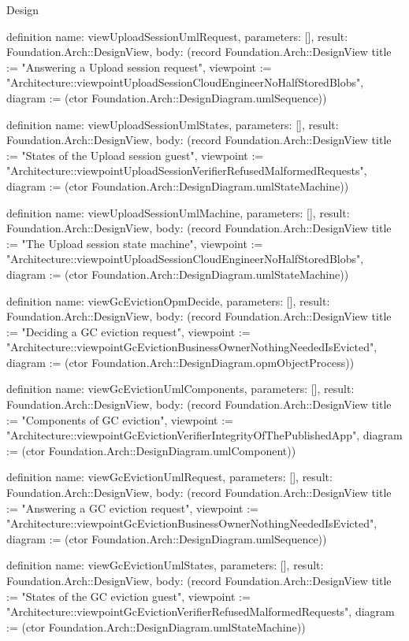 \begin{lexlean}{Design}
\begin{semanticmodule}
definition{
  name: viewUploadSessionUmlRequest,
  parameters: [],
  result: Foundation.Arch::DesignView,
  body: (record Foundation.Arch::DesignView {title := "Answering a Upload session request", viewpoint := "Architecture::viewpointUploadSessionCloudEngineerNoHalfStoredBlobs", diagram := (ctor Foundation.Arch::DesignDiagram.umlSequence)})
}

definition{
  name: viewUploadSessionUmlStates,
  parameters: [],
  result: Foundation.Arch::DesignView,
  body: (record Foundation.Arch::DesignView {title := "States of the Upload session guest", viewpoint := "Architecture::viewpointUploadSessionVerifierRefusedMalformedRequests", diagram := (ctor Foundation.Arch::DesignDiagram.umlStateMachine)})
}

definition{
  name: viewUploadSessionUmlMachine,
  parameters: [],
  result: Foundation.Arch::DesignView,
  body: (record Foundation.Arch::DesignView {title := "The Upload session state machine", viewpoint := "Architecture::viewpointUploadSessionCloudEngineerNoHalfStoredBlobs", diagram := (ctor Foundation.Arch::DesignDiagram.umlStateMachine)})
}

definition{
  name: viewGcEvictionOpmDecide,
  parameters: [],
  result: Foundation.Arch::DesignView,
  body: (record Foundation.Arch::DesignView {title := "Deciding a GC eviction request", viewpoint := "Architecture::viewpointGcEvictionBusinessOwnerNothingNeededIsEvicted", diagram := (ctor Foundation.Arch::DesignDiagram.opmObjectProcess)})
}

definition{
  name: viewGcEvictionUmlComponents,
  parameters: [],
  result: Foundation.Arch::DesignView,
  body: (record Foundation.Arch::DesignView {title := "Components of GC eviction", viewpoint := "Architecture::viewpointGcEvictionVerifierIntegrityOfThePublishedApp", diagram := (ctor Foundation.Arch::DesignDiagram.umlComponent)})
}

definition{
  name: viewGcEvictionUmlRequest,
  parameters: [],
  result: Foundation.Arch::DesignView,
  body: (record Foundation.Arch::DesignView {title := "Answering a GC eviction request", viewpoint := "Architecture::viewpointGcEvictionBusinessOwnerNothingNeededIsEvicted", diagram := (ctor Foundation.Arch::DesignDiagram.umlSequence)})
}

definition{
  name: viewGcEvictionUmlStates,
  parameters: [],
  result: Foundation.Arch::DesignView,
  body: (record Foundation.Arch::DesignView {title := "States of the GC eviction guest", viewpoint := "Architecture::viewpointGcEvictionVerifierRefusedMalformedRequests", diagram := (ctor Foundation.Arch::DesignDiagram.umlStateMachine)})
}


\end{semanticmodule}
\end{lexlean}
